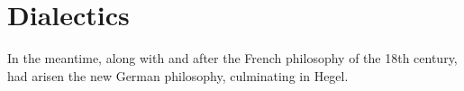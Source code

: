 \chapter{Dialectics}

In the meantime, along with and after the French philosophy of the 18th century,
had arisen the new German philosophy, culminating in Hegel.